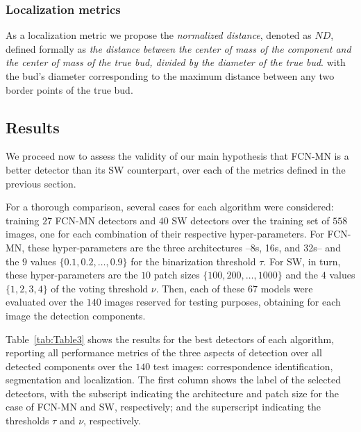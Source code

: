 \documentclass[a4paper,authoryear,review]{elsarticle}
\begin{document}
\subsubsection{Localization metrics}
\label{subsec:locmetrics}

As a localization metric we propose the \emph{normalized distance}, denoted as $ND$, defined formally as \emph{the distance between the center of mass of the component and the center of mass of the true bud, divided by the diameter of the true bud}. with the bud’s diameter corresponding to  the maximum distance between any two border points of the true bud.

\subsection{Results}
\label{sec:resultados}

We proceed now to assess the validity of our main hypothesis that FCN-MN is a better detector than its SW counterpart, over each of the metrics defined in the previous section. 

For a thorough comparison, several cases for each algorithm  were considered: training $27$ FCN-MN detectors and $40$ SW detectors over the training set of $558$ images, one for each combination of their respective hyper-parameters. For FCN-MN, these hyper-parameters are the three architectures --8s, 16s, and 32s-- and the $9$ values $\{0.1, 0.2, \ldots, 0.9\}$ for the binarization threshold $\tau$. For SW, in turn, these hyper-parameters are the $10$ patch sizes $\{100, 200, \ldots, 1000\}$  and the $4$ values $\{1, 2, 3, 4\}$ of the voting threshold $\nu$. Then, each of these $67$ models were evaluated over the $140$ images reserved for testing purposes, obtaining for each image the detection components.

Table~\ref{tab:Table3} shows the results for the best detectors of each algorithm, reporting all performance metrics of the three aspects of detection over all detected components over the $140$ test images: correspondence identification, segmentation and localization. The first column shows the label of the selected detectors, with the subscript indicating the architecture and patch size for the case of FCN-MN and SW, respectively; and the superscript indicating the thresholds $\tau$ and $\nu$, respectively.
\end{document}
